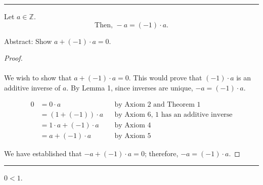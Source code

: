 \documentclass{article}
\def \proofDistance {5pt}
\newcommand{\proofseparator}{\par\noindent\rule{\textwidth}{0.4pt}}
\newcommand{\Z}{\ensuremath{\mathbb{Z}}}
\begin{document}
            \proofseparator
        
            \begin{theorem}
                Let $a\in \Z$. $$\text{Then, } -a = (-1) \cdot a.$$
            \end{theorem}
            Abstract: Show $a + (-1) \cdot a = 0$.
        
            \vspace{\proofDistance}
            
            \begin{proof}
                \mbox{}\\[-\baselineskip] \\
                We wish to show that $a + (-1) \cdot a = 0$. This would prove that $(-1) \cdot a$ is an additive inverse of $a$. By Lemma 1, since inverses are unique, $-a = (-1) \cdot a$.
            
                \begin{align*}
                    0 &= 0 \cdot a && \text{by Axiom 2 and Theorem 1} \\
                    &= (1 + (-1)) \cdot a && \text{by Axiom 6, 1 has an additive inverse} \\
                    &= 1 \cdot a + (-1) \cdot a && \text{by Axiom 4} \\
                    &= a + (-1) \cdot a && \text{by Axiom 5}
                \end{align*}
            
                We have established that $-a + (-1) \cdot a = 0$; therefore, $-a = (-1) \cdot a$.
            \end{proof}
        
            \proofseparator
    
\newpage


        
            \begin{theorem}
                $0 < 1$.
            \end{theorem}
        
            \vspace{\proofDistance}
        
\end{document}
